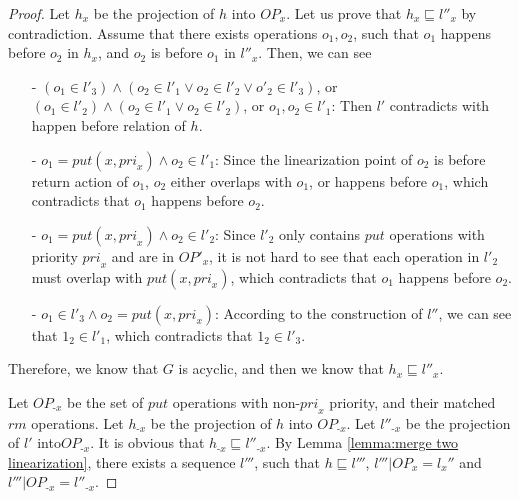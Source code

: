 \documentclass{llncs}
\begin{document}
\begin {proof}
Let $h_x$ be the projection of $h$ into $\textit{OP}_x$. Let us prove that $h_x \sqsubseteq l''_x$ by contradiction. Assume that there exists operations $o_1,o_2$, such that $o_1$ happens before $o_2$ in $h_x$, and $o_2$ is before $o_1$ in $l''_x$. Then, we can see

\begin{itemize}
\setlength{\itemsep}{0.5pt}
\item[-] $(o_1 \in l'_3) \wedge (o_2 \in l'_1 \vee o_2 \in l'_2 \vee o'_2 \in l'_3)$, or $(o_1 \in l'_2) \wedge (o_2 \in l'_1 \vee o_2 \in l'_2)$, or $o_1,o_2 \in l'_1$: Then $l'$ contradicts with happen before relation of $h$.

\item[-] $o_1 = \textit{put}(x,\textit{pri}_x) \wedge o_2 \in l'_1$: Since the linearization point of $o_2$ is before return action of $o_1$, $o_2$ either overlaps with $o_1$, or happens before $o_1$, which contradicts that $o_1$ happens before $o_2$.

\item[-] $o_1 = \textit{put}(x,\textit{pri}_x) \wedge o_2 \in l'_2$: Since $l'_2$ only contains $\textit{put}$ operations with priority $\textit{pri}_x$ and are in $\textit{OP}'_x$, it is not hard to see that each operation in $l'_2$ must overlap with $\textit{put}(x,\textit{pri}_x)$, which contradicts that $o_1$ happens before $o_2$.

\item[-] $o_1 \in l'_3 \wedge o_2 = \textit{put}(x,\textit{pri}_x)$: According to the construction of $l''$, we can see that $1_2 \in l'_1$, which contradicts that $1_2 \in l'_3$.
\end{itemize}

Therefore, we know that $G$ is acyclic, and then we know that $h_x \sqsubseteq l''_x$.

Let $\textit{OP}_{\textit{-x}}$ be the set of $\textit{put}$ operations with non-$\textit{pri}_x$ priority, and their matched $\textit{rm}$ operations. Let $h_{\textit{-x}}$ be the projection of $h$ into $\textit{OP}_{\textit{-x}}$. Let $l''_{\textit{-x}}$ be the projection of $l'$ into$\textit{OP}_{\textit{-x}}$. It is obvious that $h_{\textit{-x}} \sqsubseteq l''_{\textit{-x}}$. By Lemma \ref{lemma:merge two linearization}, there exists a sequence $l'''$, such that $h \sqsubseteq l'''$, $l''' \vert{\textit{OP}_x} = l_x''$ and $l''' \vert{\textit{OP}_{\textit{-x}}} = l''_{\textit{-x}}$.


\end{proof}
\end{document}
